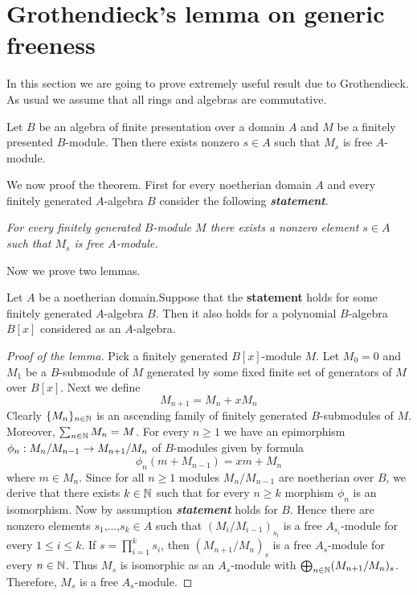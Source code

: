 \section{Grothendieck's lemma on generic freeness}
In this section we are going to prove extremely useful result due to Grothendieck. As usual we assume that all rings and algebras are commutative.
\begin{theorem}\label{theorem:genericfreeness}
Let $B$ be an algebra of finite presentation over a domain $A$ and $M$ be a finitely presented $B$-module. Then there exists nonzero $s\in A$ such that $M_s$ is free $A$-module.
\end{theorem}
\noindent
We now proof the theorem. First for every noetherian domain $A$ and every finitely generated $A$-algebra $B$ consider the following \textit{\textbf{statement}}.
\begin{center}
\textit{For every finitely generated $B$-module $M$ there exists a nonzero element $s\in A$ such that $M_s$ is free $A$-module.}
\end{center}
Now we prove two lemmas.
\begin{lemma}\label{lemma:genericfreenessfirstlemma}
Let $A$ be a noetherian domain.Suppose that the \textbf{statement} holds for some finitely generated $A$-algebra $B$. Then it also holds for a polynomial $B$-algebra $B[x]$ considered as an $A$-algebra.
\end{lemma}
\begin{proof}[Proof of the lemma]
Pick a finitely generated $B[x]$-module $M$. Let $M_0=0$ and $M_1$ be a $B$-submodule of $M$ generated by some fixed finite set of generators of $M$ over $B[x]$. Next we define
$$M_{n+1}=M_n+xM_n$$
Clearly $\{M_n\}_{n\in {\mathbb N}}$ is an ascending family of finitely generated $B$-submodules of $M$. Moreover, $\sum_{n\in {\mathbb N}}M_n=M$. For every $n\geq 1$ we have an epimorphism $\phi_n:M_n/M_{n-1}\rightarrow M_{n+1}/M_n$ of $B$-modules given by formula
$$\phi_n(m+M_{n-1})=xm+M_n$$
where $m\in M_n$. Since for all $n\geq 1$ modules $M_n/M_{n-1}$ are noetherian over $B$, we derive that there exists $k\in {\mathbb N}$ such that  for every $n\geq k$ morphism $\phi_n$ is an isomorphism. Now by assumption \textit{\textbf{statement}} holds for $B$. Hence there are nonzero elements $s_1$,...,$s_k\in A$ such that $(M_i/M_{i-1})_{s_i}$ is a free $A_{s_i}$-module for every $1\leq i\leq k$. If $s=\prod^k_{i=1}s_i$, then $(M_{n+1}/M_{n})_s$ is a free $A_s$-module for every $n\in {\mathbb N}$. Thus $M_s$ is isomorphic as an $A_s$-module with $\bigoplus_{n\in {\mathbb N}}(M_{n+1}/M_n)_s$. Therefore, $M_s$ is a free $A_s$-module.
\end{proof}
